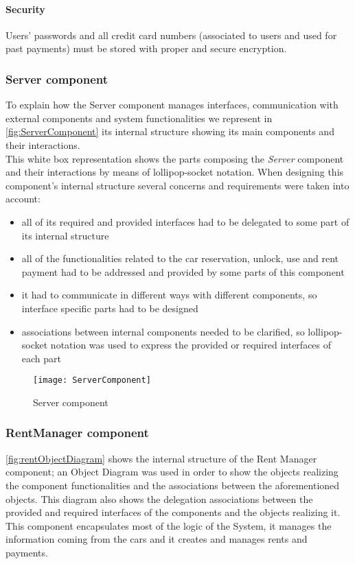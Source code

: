 \paragraph{Security}Users' passwords and all credit card numbers (associated to users and used for past payments) must be stored with proper and secure encryption.

\subsubsection{Server component}
To explain how the Server component manages interfaces, communication with external components and system functionalities we represent in \autoref{fig:ServerComponent} its internal structure showing its main components and their interactions.
\\

This white box representation shows the parts composing the \emph{Server} component and their interactions by means of lollipop-socket notation. When designing this component's internal structure several concerns and requirements were taken into account:
\begin{itemize}
	\item all of its required and provided interfaces had to be delegated to some part of its internal structure
	\item all of the functionalities related to the car reservation, unlock, use and rent payment had to be addressed and provided by some parts of this component
	\item it had to communicate in different ways with different components, so interface specific parts had to be designed
	\item associations between internal components needed to be clarified, so lollipop-socket notation was used to express the provided or required interfaces of each part
\end{itemize}

\begin{figure}[h]
			\centering
			\texttt{[image: ServerComponent]}
			\caption{
				\label{fig:ServerComponent} 
				Server component
			}
		\end{figure}
\clearpage

\subsubsection{RentManager component}

\autoref{fig:rentObjectDiagram} shows the internal structure of the Rent Manager component; an \mbox{Object} \mbox{Diagram} was used in order to show the objects realizing the component functionalities and the associations between the aforementioned objects. This diagram also shows the delegation associations between the provided and required interfaces of the components and the objects realizing it.
\\
This component encapsulates most of the logic of the System, it manages the information coming from the cars and it creates and manages rents and payments. 

